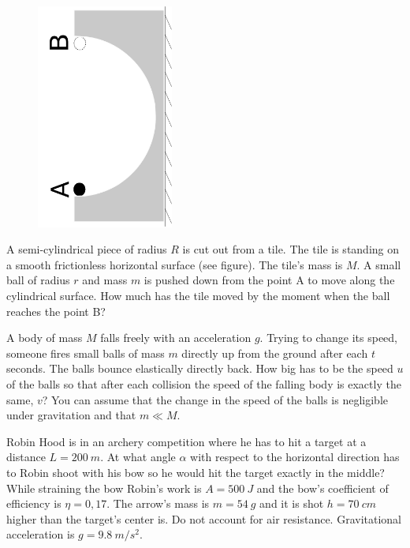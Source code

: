 \documentclass[11pt]{article}
\begin{document}
\probeng
\begin{figure}
	\vspace{-10pt}
	\includegraphics[angle=-90,origin=c,width=0.4\textwidth]{2016-v2g-08-halfpipe}
	\vspace{-60pt}
\end{figure}
A semi-cylindrical piece of radius $R$ is cut out from a tile. The tile is standing on a smooth frictionless horizontal surface (see figure). The tile’s mass is $M$. A small ball of radius $r$ and mass $m$ is pushed down from the point A to move along the cylindrical surface. How much has the tile moved by the moment when the ball reaches the point B?
\probend
\bigskip


\probeng
A body of mass $M$ falls freely with an acceleration $g$. Trying to change its speed, someone fires small balls of mass $m$ directly up from the ground after each $t$ seconds. The balls bounce elastically directly back. How big has to be the speed $u$ of the balls so that after each collision the speed of the falling body is exactly the same, $v$? You can assume that the change in the speed of the balls is negligible under gravitation and that $m\ll M$.
\probend
\bigskip


\probeng
Robin Hood is in an archery competition where he has to hit a target at a distance $L=\SI{200}{m}$. At what angle $\alpha$ with respect to the horizontal direction has to Robin shoot with his bow so he would hit the target exactly in the middle? While straining the bow Robin’s work is $A=\SI{500}{J}$ and the bow’s coefficient of efficiency is $\eta=0,17$. The arrow’s mass is $m=\SI{54}{g}$ and it is shot $h=\SI{70}{cm}$ higher than the target’s center is. Do not account for air resistance. Gravitational acceleration is $g=\SI{9,8}{m/s^2}$.
\probend
\bigskip
\end{document}
